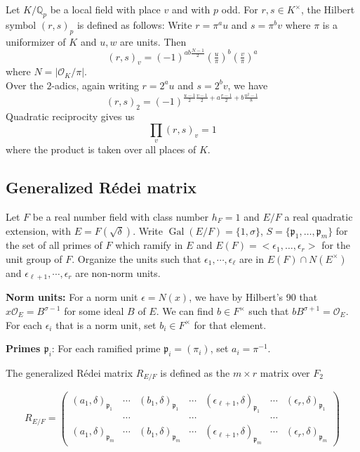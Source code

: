 \documentclass{article}
\numberwithin{equation}{section}
\theoremstyle{plain}  %
\theoremstyle{definition}
\newcommand{\Q}{\mathbb{Q}}
\newcommand{\ot}{\mathcal{O}}
\newcommand{\kron}[2]{\left( \tfrac{#1}{#2} \right)}
\newcommand{\Redei}{R\'edei }
\newcommand{\e}{\epsilon}
\DeclareMathOperator{\Gal}{Gal}
\newcommand{\fk}{\mathfrak }
\begin{document}
Let $K/\Q_p$ be a local field with place $v$ and with $p$ odd. For $r,s \in K^\times$, the Hilbert symbol $(r,s)_p$ is defined as follows: 
Write $r=\pi^a u$ and $s=\pi^b v$ where $\pi$ is a uniformizer of $K$ and $u,w$ are units. Then
\begin{equation}\label{eq: hilber symbol odd prime}
(r,s)_v = (-1)^{ab \frac{N-1}{2}} \kron{u}{\pi}^b \kron{v}{\pi}^a
\end{equation} where $N=|\ot_K/\pi|$.
\\
Over the $2$-adics, again writing $r= 2^a u$ and $s=2^b v$, we have 
\begin{equation}
    {\displaystyle (r,s)_{2}=(-1)^{{\frac{u-1}{2}\frac{v-1}{2}+a \frac{v-1}{2}+b \frac{u^2-1}{8}}} } 
\end{equation} 
Quadratic reciprocity gives us $$\prod_v (r,s)_v=1$$ where the product is taken over all places of $K$.


\subsection{Generalized \Redei matrix \texorpdfstring{\cite{MR2452635}}{citation}}

Let $F$ be a real number field with class number $h_F=1$ and $E/F$ a real quadratic extension, with $E=F(\sqrt{\delta})$. Write $\Gal(E/F)=\{1,\sigma\}$, $S=\{\fk p_1,\dots,\fk p_m\}$ for the set of all primes of $F$ which ramify in $E$ and $E(F)=<\epsilon_1,\dots,\epsilon_{r}>$ for the unit group of $F$. Organize the units such that $\epsilon_1,\cdots,\epsilon_\ell$ are in $E(F)\cap N(E^\times)$ and $\epsilon_{\ell+1},\cdots,\epsilon_r$ are non-norm units.

\textbf{Norm units:}
For a norm unit $\epsilon = N(x)$, we have by Hilbert's 90 that $x\ot_E =B^{\sigma-1}$ for some ideal $B$ of $E$. We can find $b\in F^\times$ such that $b B^{\sigma+1} = \ot_E$.  For each $\e_i$ that is a norm unit, set $b_i \in F^\times$ for that element.

\textbf{Primes $\fk p_i$}: For each ramified prime $\fk p_i=(\pi_i)$, set $a_i = \pi^{-1}$. 

The generalized \Redei matrix $R_{E/F}$ is defined as the $m\times r$ matrix over $F_2$ 

\begin{equation} \label{eq: generalized Redei}
    R_{E/F}=\begin{pmatrix}
        (a_1,\delta)_{\fk p_1} & \cdots & (b_1,\delta)_{\fk p_1} & \cdots & (\epsilon_{\ell+1},\delta)_{\fk p_1} & \cdots & (\epsilon_r,\delta)_{\fk p_1} \\
        & \cdots & & \cdots & & \cdots & \\
        (a_1,\delta)_{\fk p_m} & \cdots & (b_1,\delta)_{\fk p_m} & \cdots & (\epsilon_{\ell+1},\delta)_{\fk p_m} & \cdots & (\epsilon_r,\delta)_{\fk p_m}
    \end{pmatrix}
\end{equation}
\end{document}
